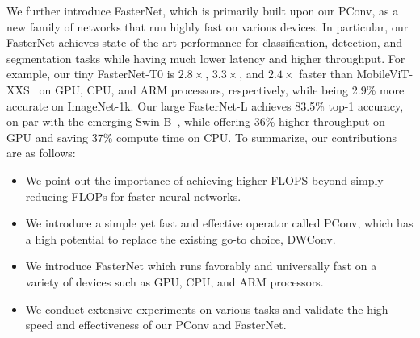 We further introduce FasterNet, which is primarily built upon our PConv, as a new family of networks that run highly fast on various devices. In particular, our FasterNet achieves state-of-the-art performance for classification, detection, and segmentation tasks while having much lower latency and higher throughput. For example, our tiny FasterNet-T0 is $2.8\times$, $3.3\times$, and $2.4\times$ faster than MobileViT-XXS~\cite{mehta2021mobilevit} on GPU, CPU, and ARM processors, respectively, while being 2.9\% more accurate on ImageNet-1k. Our large FasterNet-L achieves 83.5\% top-1 accuracy, on par with the emerging Swin-B~\cite{liu2021swin}, while offering 36\% higher throughput on GPU and saving 37\% compute time on CPU. To summarize, our contributions are as follows:
\begin{itemize}
\itemsep0em 
\item We point out the importance of achieving higher FLOPS beyond simply reducing FLOPs for faster neural networks.
\item We introduce a simple yet fast and effective operator called PConv, which has a high potential to replace the existing go-to choice, DWConv.
\item We introduce FasterNet which runs favorably and universally fast on a variety of devices such as GPU, CPU, and ARM processors.
\item We conduct extensive experiments on various tasks and validate the high speed and effectiveness of our PConv and FasterNet.
\end{itemize}